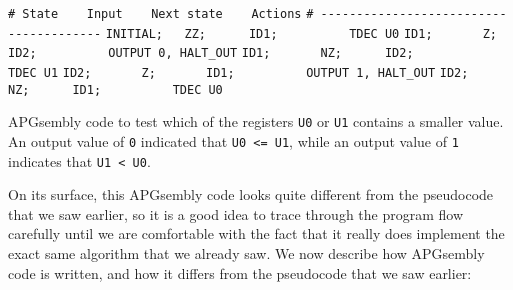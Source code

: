 \begin{apgsembly}
	\begin{algorithmic}\small
		\State \verb|# State    Input    Next state    Actions|
		\State \verb|# ---------------------------------------|
		\State \verb|INITIAL;   ZZ;      ID1;          TDEC U0|
		\State \verb|ID1;       Z;       ID2;          OUTPUT 0, HALT_OUT|
		\State \verb|ID1;       NZ;      ID2;          TDEC U1|
		\State \verb|ID2;       Z;       ID1;          OUTPUT 1, HALT_OUT|
		\State \verb|ID2;       NZ;      ID1;          TDEC U0|
	\end{algorithmic}
	\caption{APGsembly code to test which of the registers \texttt{U0} or \texttt{U1} contains a smaller value. An output value of \texttt{0} indicated that \texttt{U0 <= U1}, while an output value of \texttt{1} indicates that \texttt{U1 < U0}.}\label{alg:apgsembly_test_leq_or_ge}
\end{apgsembly}

On its surface, this APGsembly code looks quite different from the pseudocode that we saw earlier, so it is a good idea to trace through the program flow carefully until we are comfortable with the fact that it really does implement the exact same algorithm that we already saw. We now describe how APGsembly code is written, and how it differs from the pseudocode that we saw earlier:\smallskip

